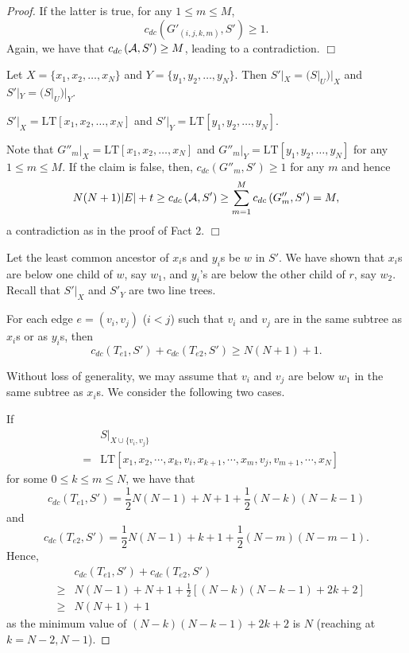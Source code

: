 \documentclass[9.5pt,journal,letterpaper,compsoc]{IEEEtran}
\begin{document}
\begin{proof}
If the latter is true, for any $1\leq m\leq M$,
 $$c_{dc}\left(G'_{(i, j, k, m)}, S'\right) \geq 1.$$
  Again, we have that
$c_{dc}\left({\cal A}, S'\right) \geq M$, leading to a
contradiction. $\Box$


  Let $X=\{x_1, x_2, \ldots, x_N\}$ and $Y=\{y_1, y_2, \ldots, y_N\}$.
 Then $S'|_{X}=(S|_{U})|_{X}$ and $S'|_{Y}=(S|_{U})|_{Y}$.
\vspace{0.5em}

 $S'|_{X}=\mbox{LT}[x_1, x_2, \ldots, x_{N}]$
and
          $S'|_{Y}=\mbox{LT}[y_1, y_2, \ldots, y_{N}]$.

  Note that
 $G''_{m}|_{X}=\mbox{LT}[x_1, x_2, \ldots, x_{N}]$
and  $G''_{m}|_{Y}=\mbox{LT}[y_1, y_2, \ldots, y_{N}]$ for any
$1\leq m\leq M$. If the claim is false, then,
 $c_{dc}\left(G''_{m}, S'\right) \geq 1$ for any $m$ and hence
$$N(N+1)|E|+t\geq  c_{dc}\left({\cal A}, S'\right) \geq \sum^{M}_{m=1}
c_{dc}\left(G''_{m}, S'\right)  = M,$$ a contradiction as in the
proof of Fact 2. $\Box$
\vspace{0.5em}

Let  the least common ancestor of $x_i$s and $y_i$s be  $w$ in $S'$.
We have shown that $x_i$s are below one child of $w$, say $w_1$, and
$y_i$'s are below the other child of $r$, say $w_2$. Recall that
$S'|_{X}$ and $S'_{Y}$ are two line trees.
\vspace{0.5em}

  For each edge $e=(v_i, v_j)$ ($i<j$) such that
          $v_i$ and $v_j$ are in the same subtree as $x_i$s or as $y_i$s,
         then
 $$c_{dc}\left(T_{e1}, S'\right)+ c_{dc}\left(T_{e2}, S'\right)\geq N(N+1)+1.$$

 Without loss of generality, we may assume that
         $v_i$ and $v_j$ are  below $w_1$ in the same subtree as $x_i$s.
We consider the
 following two cases.

  If
  \begin{eqnarray*}
  & & S|_{X\cup \{v_i, v_j\}}\\
  & =& \mbox{LT}[x_1, x_2, \cdots, x_k, v_i, x_{k+1},
    \cdots, x_{m}, v_j, v_{m+1}, \cdots, x_{N}]
    \end{eqnarray*}
     for some
 $0\leq k\leq m\leq N$,  we have that
     $$ c_{dc}\left(T_{e1}, S'\right) = \frac{1}{2}N(N-1)+N+1 + \frac{1}{2}(N-k)(N-k-1)$$
and
     $$ c_{dc}\left(T_{e2}, S'\right) = \frac{1}{2}N(N-1)+k+1 + \frac{1}{2}(N-m)(N-m-1).$$
Hence,
{\small
\begin{eqnarray*}
  & & c_{dc}\left(T_{e1}, S'\right)+ c_{dc}\left(T_{e2}, S'\right)\\
  & \geq  & N(N-1) + N+1 + \frac{1}{2} [(N-k)(N-k-1)+ 2k+2]\\
  &  \geq &  N(N+1)+1
\end{eqnarray*}
}
 as the minimum value of $(N-k)(N-k-1)+ 2k+2$ is $N$ (reaching at
$k=N-2, N-1$).



\end{proof}
\end{document}
